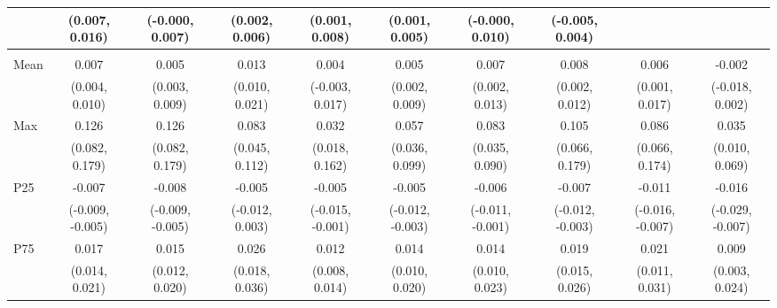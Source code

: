 {\begin{tabular}{l|c|c|c|c|c|c|c|c|c}
& {\scriptsize (0.007, 0.016)}
& {\scriptsize (-0.000, 0.007)}
& {\scriptsize (0.002, 0.006)}
& {\scriptsize (0.001, 0.008)}
& {\scriptsize (0.001, 0.005)}
& {\scriptsize (-0.000, 0.010)}
& {\scriptsize (-0.005, 0.004)}
\\ [0.1cm]
\hline
\noalign{\smallskip}
\multicolumn{10}{l}{\textbf{Effect with Leads and Lags}} \\
\noalign{\smallskip}
\hline
Mean
& 0.007 & 0.005 & 0.013 & 0.004 & 0.005 & 0.007 & 0.008 & 0.006 & -0.002 \\
& {\scriptsize (0.004, 0.010)}
& {\scriptsize (0.003, 0.009)}
& {\scriptsize (0.010, 0.021)}
& {\scriptsize (-0.003, 0.017)}
& {\scriptsize (0.002, 0.009)}
& {\scriptsize (0.002, 0.013)}
& {\scriptsize (0.002, 0.012)}
& {\scriptsize (0.001, 0.017)}
& {\scriptsize (-0.018, 0.002)}
\\ [0.1cm]
\hline
Max
& 0.126 & 0.126 & 0.083 & 0.032 & 0.057 & 0.083 & 0.105 & 0.086 & 0.035 \\
& {\scriptsize (0.082, 0.179)}
& {\scriptsize (0.082, 0.179)}
& {\scriptsize (0.045, 0.112)}
& {\scriptsize (0.018, 0.162)}
& {\scriptsize (0.036, 0.099)}
& {\scriptsize (0.035, 0.090)}
& {\scriptsize (0.066, 0.179)}
& {\scriptsize (0.066, 0.174)}
& {\scriptsize (0.010, 0.069)}
\\ [0.1cm]
\hline
P25
& -0.007 & -0.008 & -0.005 & -0.005 & -0.005 & -0.006 & -0.007 & -0.011 & -0.016 \\
& {\scriptsize (-0.009, -0.005)}
& {\scriptsize (-0.009, -0.005)}
& {\scriptsize (-0.012, 0.003)}
& {\scriptsize (-0.015, -0.001)}
& {\scriptsize (-0.012, -0.003)}
& {\scriptsize (-0.011, -0.001)}
& {\scriptsize (-0.012, -0.003)}
& {\scriptsize (-0.016, -0.007)}
& {\scriptsize (-0.029, -0.007)}
\\ [0.1cm]
\hline
P75
& 0.017 & 0.015 & 0.026 & 0.012 & 0.014 & 0.014 & 0.019 & 0.021 & 0.009 \\
& {\scriptsize (0.014, 0.021)}
& {\scriptsize (0.012, 0.020)}
& {\scriptsize (0.018, 0.036)}
& {\scriptsize (0.008, 0.014)}
& {\scriptsize (0.010, 0.020)}
& {\scriptsize (0.010, 0.023)}
& {\scriptsize (0.015, 0.026)}
& {\scriptsize (0.011, 0.031)}
& {\scriptsize (0.003, 0.024)}
\\ [0.1cm]
\hline
\hline
\end{tabular}
}
